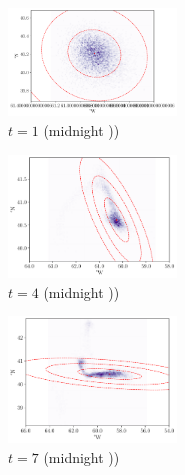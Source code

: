 \begin{figure}
	\begin{center}
		\begin{subfigure}{\textwidth}
			\includegraphics[width=0.49\textwidth]{chp06_applications/figures/gulf_stream/traj_stoch_em_1.pdf}
			\caption{\(t = 1\) (midnight ))}
		\end{subfigure}

		\begin{subfigure}{\textwidth}
			\includegraphics[width=0.49\textwidth]{chp06_applications/figures/gulf_stream/traj_stoch_em_4.pdf}
			\caption{\(t = 4\) (midnight ))}
		\end{subfigure}

		\begin{subfigure}{\textwidth}
			\includegraphics[width=0.49\textwidth]{chp06_applications/figures/gulf_stream/traj_stoch_em_7.pdf}
			\caption{\(t = 7\) (midnight ))}
		\end{subfigure}
		\caption{}
		\label{fig:}
	\end{center}
\end{figure}



